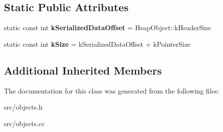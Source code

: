 \subsection*{Static Public Attributes}
\begin{DoxyCompactItemize}
\item 
\hypertarget{classv8_1_1internal_1_1_declared_accessor_descriptor_aa03565a6c0406a50f59aaea5b9928fec}{}static const int {\bfseries k\+Serialized\+Data\+Offset} = Heap\+Object\+::k\+Header\+Size\label{classv8_1_1internal_1_1_declared_accessor_descriptor_aa03565a6c0406a50f59aaea5b9928fec}

\item 
\hypertarget{classv8_1_1internal_1_1_declared_accessor_descriptor_a9a3d760fddb6ec7aef6458b4ae4a501c}{}static const int {\bfseries k\+Size} = k\+Serialized\+Data\+Offset + k\+Pointer\+Size\label{classv8_1_1internal_1_1_declared_accessor_descriptor_a9a3d760fddb6ec7aef6458b4ae4a501c}

\end{DoxyCompactItemize}
\subsection*{Additional Inherited Members}


The documentation for this class was generated from the following files\+:\begin{DoxyCompactItemize}
\item 
src/objects.\+h\item 
src/objects.\+cc\end{DoxyCompactItemize}
